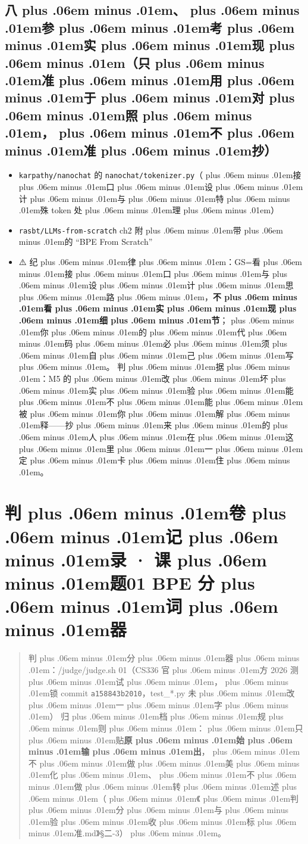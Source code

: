 \documentclass[
]{article}
\newcommand{\passthrough}[1]{#1}
\providecommand{\tightlist}{%
  \setlength{\itemsep}{0pt}\setlength{\parskip}{0pt}}
\providecommand{\texorpdfstring}[2]{#1}   %
\def\zh#1{{\zhfont #1}}
\def\sym#1{{\symfont #1}}
\def\codezh#1{{\zhmonofont #1}}
\def\zhglue{\hskip0pt plus .06em minus .01em}
\begin{document}
\subsection{\texorpdfstring{\zh{八\zhglue 、\zhglue 参\zhglue 考\zhglue 实\zhglue 现\zhglue （}\textbf{\zh{只\zhglue 准\zhglue 用\zhglue 于\zhglue 对\zhglue 照\zhglue ，\zhglue 不\zhglue 准\zhglue 抄}}\zh{）}}{\zh{八\zhglue 、\zhglue 参\zhglue 考\zhglue 实\zhglue 现\zhglue （\zhglue 只\zhglue 准\zhglue 用\zhglue 于\zhglue 对\zhglue 照\zhglue ，\zhglue 不\zhglue 准\zhglue 抄\zhglue ）}}}\label{ux516bux53c2ux8003ux5b9eux73b0ux53eaux51c6ux7528ux4e8eux5bf9ux7167ux4e0dux51c6ux6284}

\begin{itemize}
\tightlist
\item
  \passthrough{\lstinline!karpathy/nanochat!} \zh{的} \passthrough{\lstinline!nanochat/tokenizer.py!}\zh{（\zhglue 接\zhglue 口\zhglue 设\zhglue 计\zhglue 与\zhglue 特\zhglue 殊} token \zh{处\zhglue 理\zhglue ）}
\item
  \passthrough{\lstinline!rasbt/LLMs-from-scratch!} ch2 \zh{附\zhglue 带\zhglue 的} ``BPE From Scratch''
\item
  \sym{⚠️} \zh{纪\zhglue 律\zhglue ：}GS=\zh{看\zhglue 接\zhglue 口\zhglue 与\zhglue 设\zhglue 计\zhglue 思\zhglue 路\zhglue ，}\textbf{\zh{不\zhglue 看\zhglue 实\zhglue 现\zhglue 细\zhglue 节}}\zh{；\zhglue 你\zhglue 的\zhglue 代\zhglue 码\zhglue 必\zhglue 须\zhglue 自\zhglue 己\zhglue 写\zhglue 。} \zh{判\zhglue 据\zhglue ：}M5 \zh{的\zhglue 改\zhglue 坏\zhglue 实\zhglue 验\zhglue 能\zhglue 不\zhglue 能\zhglue 被\zhglue 你\zhglue 解\zhglue 释}------\zh{抄\zhglue 来\zhglue 的\zhglue 人\zhglue 在\zhglue 这\zhglue 里\zhglue 一\zhglue 定\zhglue 卡\zhglue 住\zhglue 。}
\end{itemize}

\newpage

\section{\zh{判\zhglue 卷\zhglue 记\zhglue 录} \sym{·} \zh{课\zhglue 题}01 BPE \zh{分\zhglue 词\zhglue 器}}\label{ux5224ux5377ux8bb0ux5f55-ux8bfeux989801-bpe-ux5206ux8bcdux5668}

\begin{quote}
\zh{判\zhglue 分\zhglue 器\zhglue ：}\passthrough{\codezh{{\zh{环}}{\zh{境}}/judge/judge.sh 01}}\zh{（}CS336 \zh{官\zhglue 方} 2026 \zh{测\zhglue 试\zhglue ，\zhglue 锁} commit \passthrough{\lstinline!a158843b2010!}\zh{，}test\_*.py \zh{未\zhglue 改\zhglue 一\zhglue 字\zhglue ）} \zh{归\zhglue 档\zhglue 规\zhglue 则\zhglue ：\zhglue 只\zhglue 贴}\textbf{\zh{原\zhglue 始\zhglue 输\zhglue 出}}\zh{，\zhglue 不\zhglue 做\zhglue 美\zhglue 化\zhglue 、\zhglue 不\zhglue 做\zhglue 转\zhglue 述\zhglue （\zhglue 《\zhglue 判\zhglue 分\zhglue 与\zhglue 验\zhglue 收\zhglue 标\zhglue 准}.md\zh{》}\sym{§}\zh{二}-3\zh{）\zhglue 。}
\end{quote}
\end{document}
